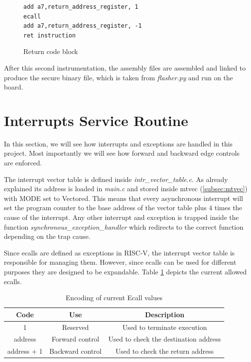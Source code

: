 \begin{figure}[htbp]
  \centering
  \begin{lstlisting}
add a7,return_address_register, 1
ecall
add a7,return_address_register, -1
ret instruction
 \end{lstlisting}
  \caption{Return code block}
  \label{fig:retblock}
\end{figure}

After this second instrumentation, the assembly files are assembled and linked to
produce the secure binary file, which is taken from \textit{flasher.py} and run on
the board.

\section{Interrupts Service Routine}
\label{sec:project_isr}

In this section, we will see how interrupts and exceptions are handled in this project.
Most importantly we will see how forward and backward edge controls are enforced.

The interrupt vector table is defined inside \textit{intr\_vector\_table.c}. As
already explained its address is loaded in \textit{main.c} and stored inside mtvec
(\ref{subsec:mtvec}) with MODE set to Vectored. This means that every
asynchronous interrupt will set the program counter to the base address of the
vector table plus $4$ times the cause of the interrupt. Any other interrupt and exception
is trapped inside the function \textit{synchronous\_exception\_handler} which
redirects to the correct function depending on the trap cause.

Since ecalls are defined as exceptions in RISC-V, the interrupt vector table is responsible
for managing them. However, since ecalls can be used for different purposes they
are designed to be expandable. Table \ref{tab:ecalls} depicts the current
allowed ecalls.

\begin{table}
  \centering
  \begin{tabular}{|c|c|c|}
    \hline
    \textbf{Code} & \textbf{Use}     & \textbf{Description}                  \\
    \hline
    1             & Reserved         & Used to terminate execution           \\
    \hline
    address       & Forward control  & Used to check the destination address \\
    \hline
    address + 1   & Backward control & Used to check the return address      \\
    \hline
  \end{tabular}
  \caption{Encoding of current Ecall values}
  \label{tab:ecalls}
\end{table}

